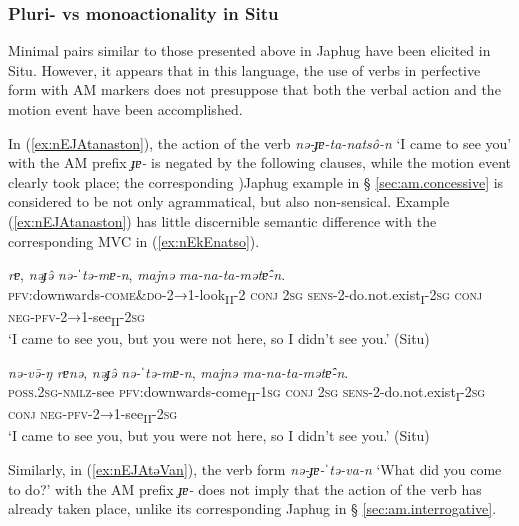 \documentclass[oneside,a4paper,11pt]{article}
\newcommand{\ipa}[1]{{\phon\textit{#1}}}
\newcommand{\sens}[1]{‘#1’}
\newcommand{\rouge}[1]{{\color{red}#1}}
\begin{document}
\subsubsection{Pluri- vs monoactionality in Situ} \label{sec:am.situ}
Minimal pairs similar to those presented above in Japhug have been elicited in Situ. However, it appears that in this language, the use of verbs in perfective form with AM markers does not presuppose that both the verbal action and the motion event have been accomplished. 


In (\ref{ex:nEJAtanaston}), the action of the verb \ipa{nə-ɟɐ-ta-natsô-n}  `I came to see you' with the AM prefix \ipa{ɟɐ-} is negated by the following clauses, while the motion event clearly took place; the corresponding )Japhug example in § \ref{sec:am.concessive} is considered to be not only agrammatical, but also non-sensical. Example (\ref{ex:nEJAtanaston}) has little discernible semantic difference with the corresponding MVC in (\ref{ex:nEkEnatso}).
 

\begin{exe}
\ex \label{ex:nEJAtanaston}
\gll \ipa{nə-\rouge{ɟɐ}-ta-natsô-n} \ipa{rɐ}, \ipa{nəɟə̂} \ipa{nə-ˈtə-mɐ-n}, \ipa{majnə} \ipa{ma-na-ta-mətɐ̂-n}.\\
\textsc{pfv}:downwards-\textsc{\rouge{come\&do}}-2→1-look\textsubscript{II}-2 \textsc{conj} \textsc{2sg} \textsc{sens}-2-do.not.exist\textsubscript{I}-\textsc{2sg} \textsc{conj} \textsc{neg}-\textsc{pfv}-2→1-see\textsubscript{II}-\textsc{2sg}\\
\glt  \sens{I came to see you, but you were not here, so I didn't see you.} (Situ)
\end{exe}

\begin{exe}
\ex  \label{ex:nEkEnatso}
\gll \ipa{nə-kə-natsō} \ipa{nə-və̄-ŋ} \ipa{rɐnə}, \ipa{nəɟə̂} \ipa{nə-ˈtə-mɐ-n}, \ipa{majnə} \ipa{ma-na-ta-mətɐ̂-n}.\\
\textsc{poss.2sg}-\textsc{nmlz}-see \textsc{pfv}:downwards-come\textsubscript{II}-\textsc{1sg} \textsc{conj} \textsc{2sg} \textsc{sens}-2-do.not.exist\textsubscript{I}-\textsc{2sg} \textsc{conj} \textsc{neg}-\textsc{pfv}-2→1-see\textsubscript{II}-\textsc{2sg}\\
\glt  \sens{I came to see you, but you were not here, so I didn't see you.} (Situ)
\end{exe}

Similarly, in (\ref{ex:nEJAtəVan}), the verb form  \ipa{nə-ɟɐ-ˈtə-va-n}  \sens{What did you come to do?} with the AM prefix \ipa{ɟɐ-} does not imply that the action of the verb has already taken place, unlike its corresponding Japhug in § \ref{sec:am.interrogative}.
\end{document}
